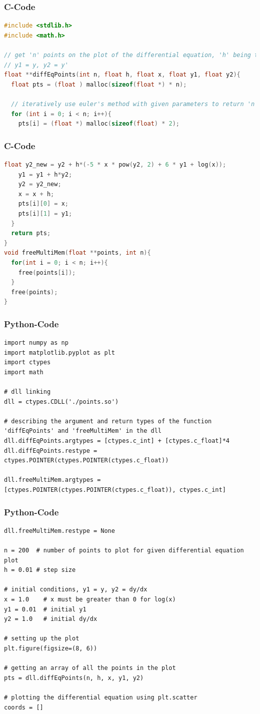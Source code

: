 \documentclass{beamer}
\begin{document}
\begin{frame}[fragile]
\frametitle{C-Code}
\begin{lstlisting}[language=C]
#include <stdlib.h>
#include <math.h>

// get 'n' points on the plot of the differential equation, 'h' being the step size, 'x', 'y1', 'y2' being the inital conditions
// y1 = y, y2 = y'
float **diffEqPoints(int n, float h, float x, float y1, float y2){
  float pts = (float ) malloc(sizeof(float *) * n);

  // iteratively use euler's method with given parameters to return 'n' points in the plot of the differential equation
  for (int i = 0; i < n; i++){
    pts[i] = (float *) malloc(sizeof(float) * 2);
\end{lstlisting}
\end{frame}
\begin{frame}[fragile]
\frametitle{C-Code}
    \begin{lstlisting}[language=C]
           float y2_new = y2 + h*(-5 * x * pow(y2, 2) + 6 * y1 + log(x));
    y1 = y1 + h*y2;
    y2 = y2_new;
    x = x + h;
    pts[i][0] = x;
    pts[i][1] = y1;
  }
  return pts;
}
void freeMultiMem(float **points, int n){
  for(int i = 0; i < n; i++){
    free(points[i]);
  }
  free(points);
}
    \end{lstlisting}
\end{frame}
\begin{frame}[fragile]
\frametitle{Python-Code}
\begin{lstlisting}
import numpy as np
import matplotlib.pyplot as plt
import ctypes
import math

# dll linking
dll = ctypes.CDLL('./points.so')

# describing the argument and return types of the function 'diffEqPoints' and 'freeMultiMem' in the dll
dll.diffEqPoints.argtypes = [ctypes.c_int] + [ctypes.c_float]*4
dll.diffEqPoints.restype = ctypes.POINTER(ctypes.POINTER(ctypes.c_float))

dll.freeMultiMem.argtypes = [ctypes.POINTER(ctypes.POINTER(ctypes.c_float)), ctypes.c_int]
\end{lstlisting}
\end{frame}
\begin{frame}[fragile]
\frametitle{Python-Code}
\begin{lstlisting}
dll.freeMultiMem.restype = None

n = 200  # number of points to plot for given differential equation plot
h = 0.01 # step size

# initial conditions, y1 = y, y2 = dy/dx
x = 1.0    # x must be greater than 0 for log(x)
y1 = 0.01  # initial y1
y2 = 1.0   # initial dy/dx

# setting up the plot
plt.figure(figsize=(8, 6))

# getting an array of all the points in the plot
pts = dll.diffEqPoints(n, h, x, y1, y2)

# plotting the differential equation using plt.scatter
coords = []

\end{lstlisting}
\end{frame}
\end{document}
